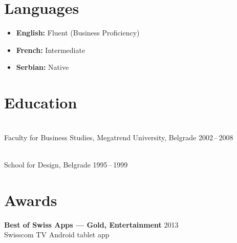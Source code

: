 \documentclass[a4paper,9.5pt]{article}
\begin{document}
\section{Languages}

\begin{itemize}[leftmargin=1.2em, label={•},
    topsep=0pt, itemsep=2pt, parsep=0pt]
  \item {\small\textbf{English:} Fluent (Business Proficiency)}
  \item {\small\textbf{French:} Intermediate}
  \item {\small\textbf{Serbian:} Native}
\end{itemize}

\section{Education}

\\[1pt]
{\small\color{midgray}Faculty for Business Studies,
Megatrend University, Belgrade \hfill 2002\,--\,2008}

\vspace{6pt}

\\[1pt]
{\small\color{midgray}School for Design, Belgrade
\hfill 1995\,--\,1999}

\section{Awards}

{\small\textbf{Best of Swiss Apps — Gold, Entertainment} \hfill 2013\\
\color{midgray}Swisscom TV Android tablet app}
\end{document}
